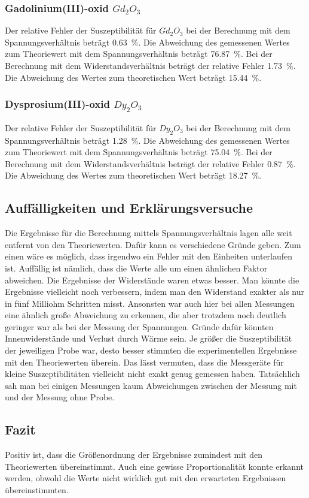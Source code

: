 \subsubsection{Gadolinium(III)-oxid $Gd_2 O_3$}
Der relative Fehler der Suszeptibilität für $Gd_2 O_3$ bei der Berechnung mit dem Spannungsverhältnis beträgt \SI{0.63}{\percent}. 
Die Abweichung des gemessenen Wertes zum Theoriewert mit dem Spannungsverhältnis beträgt \SI{76.87}{\percent}.
\newline
Bei der Berechnung mit dem Widerstandsverhältnis beträgt der relative Fehler \SI{1.73}{\percent}.
Die Abweichung des Wertes zum theoretischen Wert beträgt \SI{15.44}{\percent}.

\subsubsection{Dysprosium(III)-oxid $Dy_2 O_3$}
Der relative Fehler der Suszeptibilität für $Dy_2 O_3$ bei der Berechnung mit dem Spannungsverhältnis beträgt \SI{1.28}{\percent}. 
Die Abweichung des gemessenen Wertes zum Theoriewert mit dem Spannungsverhältnis beträgt \SI{75.04}{\percent}.
\newline
Bei der Berechnung mit dem Widerstandsverhältnis beträgt der relative Fehler \SI{0.87}{\percent}.
Die Abweichung des Wertes zum theoretischen Wert beträgt \SI{18.27}{\percent}.


\subsection{Auffälligkeiten und Erklärungsversuche}
Die Ergebnisse für die Berechnung mittels Spannungsverhältnis lagen alle weit entfernt von den Theoriewerten. Dafür kann es verschiedene Gründe geben. Zum einen wäre es 
möglich, dass irgendwo ein Fehler mit den Einheiten unterlaufen ist. 
Auffällig ist nämlich, dass die Werte alle um einen ähnlichen Faktor abweichen. 
\newline
Die Ergebnisse der Widerstände waren etwas besser. Man könnte die Ergebnisse vielleicht noch verbessern, indem man den Widerstand exakter als 
nur in fünf Milliohm Schritten misst. Ansonsten war auch hier bei allen Messungen eine ähnlich große Abweichung zu erkennen, die aber 
trotzdem noch deutlich geringer war als bei der Messung der Spannungen. Gründe dafür könnten Innenwiderstände und Verlust durch Wärme sein. 
\newline
Je größer die Suszeptibilität der jeweiligen Probe war, desto besser stimmten die experimentellen Ergebnisse mit den Theoriewerten überein. 
Das lässt vermuten, dass die Messgeräte für kleine Suszeptibilitäten vielleicht nicht exakt genug gemessen haben. Tatsächlich sah man bei 
einigen Messungen kaum Abweichungen zwischen der Messung mit und der Messung ohne Probe. 

\subsection{Fazit}
Positiv ist, dass die Größenordnung der Ergebnisse zumindest mit den Theoriewerten übereinstimmt. Auch eine gewisse  Proportionalität konnte 
erkannt werden, obwohl die Werte nicht wirklich gut mit den erwarteten Ergebnissen übereinstimmten.
